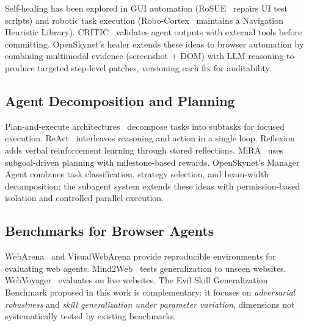 Self-healing has been explored in GUI automation (RoSUE~\cite{rosue} repairs UI test scripts) and robotic task execution (Robo-Cortex~\cite{robocortex} maintains a Navigation Heuristic Library). CRITIC~\cite{critic} validates agent outputs with external tools before committing. OpenSkynet's healer extends these ideas to browser automation by combining multimodal evidence (screenshot + DOM) with LLM reasoning to produce targeted step-level patches, versioning each fix for auditability.

\subsection{Agent Decomposition and Planning}

Plan-and-execute architectures~\cite{react} decompose tasks into subtasks for focused execution. ReAct~\cite{react} interleaves reasoning and action in a single loop. Reflexion~\cite{reflexion} adds verbal reinforcement learning through stored reflections. MiRA~\cite{mira} uses subgoal-driven planning with milestone-based rewards. OpenSkynet's Manager Agent combines task classification, strategy selection, and beam-width decomposition; the subagent system extends these ideas with permission-based isolation and controlled parallel execution.

\subsection{Benchmarks for Browser Agents}

WebArena~\cite{webarena} and VisualWebArena provide reproducible environments for evaluating web agents. Mind2Web~\cite{mind2web} tests generalization to unseen websites. WebVoyager~\cite{webvoyager} evaluates on live websites. The Evil Skill Generalization Benchmark proposed in this work is complementary: it focuses on \emph{adversarial robustness} and \emph{skill generalization under parameter variation}, dimensions not systematically tested by existing benchmarks.
